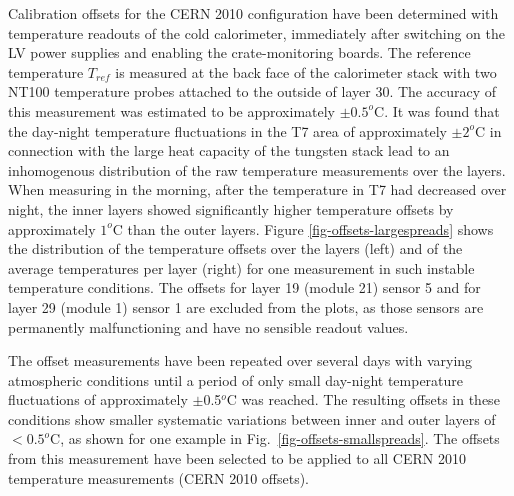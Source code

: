 \documentclass[a4paper,10pt]{article}
\begin{document}
Calibration offsets for the CERN 2010 configuration have been determined with temperature readouts
of the cold calorimeter, immediately after switching on the LV power supplies and enabling the
crate-monitoring boards.
The reference temperature $T_{ref}$ is measured at the back 
face of the calorimeter stack with two NT100 temperature probes attached to the outside of layer 30.
The accuracy of this measurement was estimated to be approximately $\pm0.5^o$C.  It was found that 
the day-night temperature fluctuations in the T7 area of approximately $\pm2^o$C 
in connection with the large heat capacity of the tungsten stack
lead to an inhomogenous distribution of the raw temperature measurements over the layers. When measuring
in the morning, after the temperature in T7 had decreased over night, the inner layers showed significantly
higher temperature offsets by approximately $1^o$C than the outer layers. Figure \ref{fig-offsets-largespreads} 
shows the distribution of the temperature offsets over the layers (left) and of the average temperatures per layer (right)
for one measurement in such instable temperature conditions.  The offsets for layer 19 (module 21) sensor 5 and
for layer 29 (module 1) sensor 1 are excluded from the plots, as those sensors are permanently malfunctioning and 
have no sensible readout values.

The offset measurements have been repeated over several days with varying atmospheric conditions until 
a period of only small day-night temperature fluctuations of approximately $\pm$0.5$^o$C was reached. 
The resulting
offsets in these conditions show smaller systematic variations between inner and outer layers of $<0.5^o$C,
as shown for one example in Fig.~\ref{fig-offsets-smallspreads}. The offsets from this measurement have been
selected to be applied to all CERN 2010 temperature measurements (CERN 2010 offsets).
\end{document}
